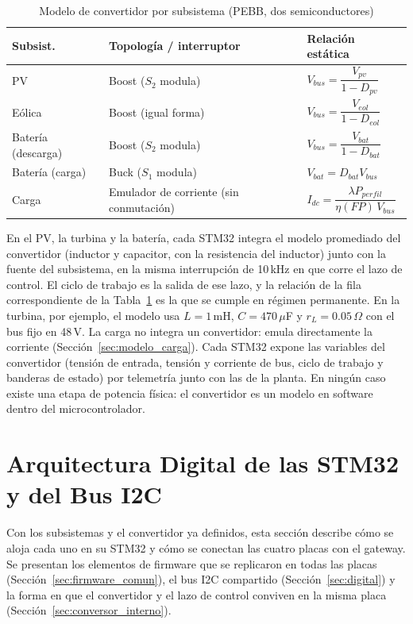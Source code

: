 \documentclass[conference]{IEEEtran}
\begin{document}
\begin{table}[H]
\caption{Modelo de convertidor por subsistema (PEBB, dos semiconductores)}
\label{tab:convertidores}
\centering
\scriptsize
\begin{tabular}{|p{1.3cm}|p{2.5cm}|p{2.7cm}|}
\hline
\textbf{Subsist.} & \textbf{Topología / interruptor} & \textbf{Relación estática} \\
\hline
PV & Boost ($S_2$ modula) & $V_{bus}=\dfrac{V_{pv}}{1-D_{pv}}$ \\
\hline
Eólica & Boost (igual forma) & $V_{bus}=\dfrac{V_{eol}}{1-D_{eol}}$ \\
\hline
Batería (descarga) & Boost ($S_2$ modula) & $V_{bus}=\dfrac{V_{bat}}{1-D_{bat}}$ \\
\hline
Batería (carga) & Buck ($S_1$ modula) & $V_{bat}=D_{bat}V_{bus}$ \\
\hline
Carga & Emulador de corriente (sin conmutación) & $I_{dc}=\dfrac{\lambda P_{perfil}}{\eta(FP)\,V_{bus}}$ \\
\hline
\end{tabular}
\end{table}

En el PV, la turbina y la batería, cada STM32 integra el modelo promediado del convertidor (inductor y capacitor, con la resistencia del inductor) junto con la fuente del subsistema, en la misma interrupción de 10\,kHz en que corre el lazo de control. El ciclo de trabajo es la salida de ese lazo, y la relación de la fila correspondiente de la Tabla~\ref{tab:convertidores} es la que se cumple en régimen permanente. En la turbina, por ejemplo, el modelo usa $L=1$\,mH, $C=470\,\mu$F y $r_L=0.05\,\Omega$ con el bus fijo en 48\,V.
La carga no integra un convertidor: emula directamente la corriente (Sección~\ref{sec:modelo_carga}). Cada STM32 expone las variables del convertidor (tensión de entrada, tensión y corriente de bus, ciclo de trabajo y banderas de estado) por telemetría junto con las de la planta. En ningún caso existe una etapa de potencia física: el convertidor es un modelo en software dentro del microcontrolador.

\section{Arquitectura Digital de las STM32 y del Bus I2C}
\label{sec:arquitectura}

Con los subsistemas y el convertidor ya definidos, esta sección describe cómo se aloja cada uno en su STM32 y cómo se conectan las cuatro placas con el gateway. Se presentan los elementos de firmware que se replicaron en todas las placas (Sección~\ref{sec:firmware_comun}), el bus I2C compartido (Sección~\ref{sec:digital}) y la forma en que el convertidor y el lazo de control conviven en la misma placa (Sección~\ref{sec:conversor_interno}).
\end{document}
